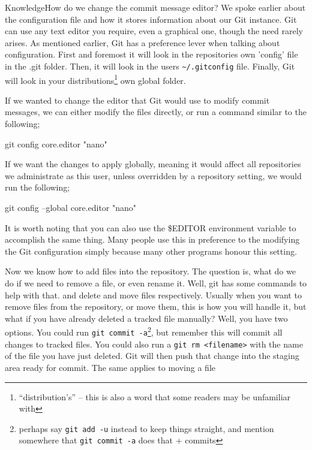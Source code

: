 \begin{callout}{Knowledge}{How do we change the commit message editor?}
We spoke earlier about the configuration file and how it stores information about our Git instance.
Git can use any text editor you require, even a graphical one, though the need rarely arises.
As mentioned earlier, Git has a preference lever when talking about configuration.
First and foremost it will look in the repositories own 'config' file in the .git folder.
Then, it will look in the users \texttt{\textasciitilde/.gitconfig} file.
Finally, Git will look in your distributions\footnote{``distribution's'' -- this is also a word that some readers may be unfamiliar with} own global folder.

If we wanted to change the editor that Git would use to modify commit messages, we can either modify the files directly, or run a command similar to the following;

\begin{code}
git config core.editor "nano"
\end{code}

If we want the changes to apply globally, meaning it would affect all repositories we administrate as this user, unless overridden by a repository setting, we would run the following;

\begin{code}
git config --global core.editor "nano"
\end{code}

It is worth noting that you can also use the \$EDITOR environment variable to accomplish the same thing.
Many people use this in preference to the modifying the Git configuration simply because many other programs honour this setting.
\end{callout}

Now we know how to add files into the repository.
The question is, what do we do if we need to remove a file, or even rename it.
Well, git has some commands to help with that.
 and  delete and move files respectively.
Usually when you want to remove files from the repository, or move them, this is how you will handle it, but what if you have already deleted a tracked file manually? Well, you have two options.
You could run \texttt{git commit -a}\footnote{perhaps say \texttt{git~add~-u} instead to keep things straight, and mention somewhere that \texttt{git~commit~-a} does that + commits}, but remember this will commit all changes to tracked files.
You could also run a \texttt{git rm <filename>} with the name of the file you have just deleted.
Git will then push that change into the staging area ready for commit.
The same applies to moving a file

